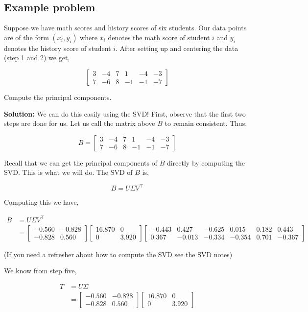 \documentclass{article}
\begin{document}
\subsection{Example problem}
Suppose we have math scores and history scores of six students. Our data points are of the form $(x_i,y_i)$ where $x_i$ denotes the math score of student $i$ and $y_i$ denotes the
history score of student $i$. After setting up and centering the data (step 1 and 2) we get,

$$\begin{bmatrix}
3& -4& 7& 1& -4& -3\\
7& -6& 8& -1& -1& -7
\end{bmatrix}$$

\noindent Compute the principal components.

\bigskip

\textbf{Solution:} We can do this easily using the SVD! First, observe that the first two steps are done for us. Let us call the matrix above $B$ to remain consistent. Thus,

$$B=\begin{bmatrix}
3&-4&7&1&-4&-3\\
7&-6&8&-1&-1&-7
\end{bmatrix}$$

Recall that we can get the principal components of $B$ directly by computing the SVD. This is what we will do. The SVD of $B$ is,

$$B=U\Sigma V^\top$$

Computing this we have,

\begin{align}
B&=U\Sigma V^\top\\
&=\begin{bmatrix}
-0.560&-0.828\\
-0.828&0.560\end{bmatrix}
\begin{bmatrix}
16.870&0\\
0&3.920
\end{bmatrix}
\begin{bmatrix}-0.443&0.427&-0.625&0.015&0.182&0.443\\
0.367&-0.013&-0.334&-0.354&0.701&-0.367\end{bmatrix}
\end{align}

(If you need a refresher about how to compute the SVD see the SVD notes)

We know from step five,

\begin{align}
T&=U\Sigma\\
&=\begin{bmatrix}
-0.560&-0.828\\
-0.828&0.560\end{bmatrix}
\begin{bmatrix}
16.870&0\\
0&3.920
\end{bmatrix}
\end{align}
\end{document}
